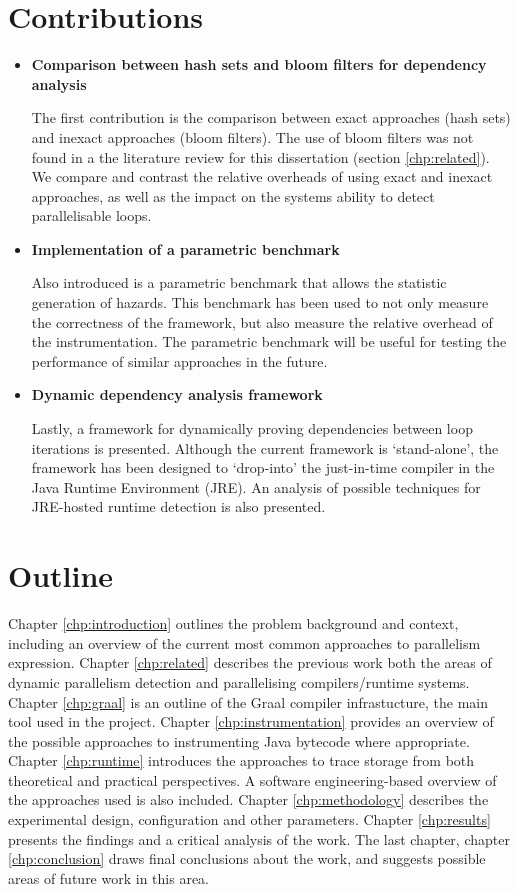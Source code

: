 \section{Contributions} \label{sec:introduction/contributions}
\begin{itemize}
	\item \textbf{Comparison between hash sets and bloom filters for dependency analysis}
	
	The first contribution is the comparison between exact approaches (hash sets) and inexact approaches (bloom filters). The use of bloom filters was not found in a the literature review for this dissertation (section \ref{chp:related}). We compare and contrast the relative overheads of using exact and inexact approaches, as well as the impact on the systems ability to detect parallelisable loops.

	\item \textbf{Implementation of a parametric benchmark}
	
	Also introduced is a parametric benchmark that allows the statistic generation of hazards. This benchmark has been used to not only measure the correctness of the framework, but also measure the relative overhead of the instrumentation. The parametric benchmark will be useful for testing the performance of similar approaches in the future.

	\item \textbf{Dynamic dependency analysis framework}
	
	Lastly, a framework for dynamically proving dependencies between loop iterations is presented. Although the current framework is `stand-alone', the framework has been designed to `drop-into' the just-in-time compiler in the Java Runtime Environment (JRE). An analysis of possible techniques for JRE-hosted runtime detection is also presented.
\end{itemize}

\section{Outline} \label{sec:introduction/outline}
Chapter \ref{chp:introduction} outlines the problem background and context, including an overview of the current most common approaches to parallelism expression. Chapter \ref{chp:related} describes the previous work both the areas of dynamic parallelism detection and parallelising compilers/runtime systems. Chapter \ref{chp:graal} is an outline of the Graal compiler infrastucture, the main tool used in the project. Chapter \ref{chp:instrumentation} provides an overview of the possible approaches to instrumenting Java bytecode where appropriate. Chapter \ref{chp:runtime} introduces the approaches to trace storage from both theoretical and practical perspectives. A software engineering-based overview of the approaches used is also included. Chapter \ref{chp:methodology} describes the experimental design, configuration and other parameters. Chapter \ref{chp:results} presents the findings and a critical analysis of the work. The last chapter, chapter \ref{chp:conclusion} draws final conclusions about the work, and suggests possible areas of future work in this area.